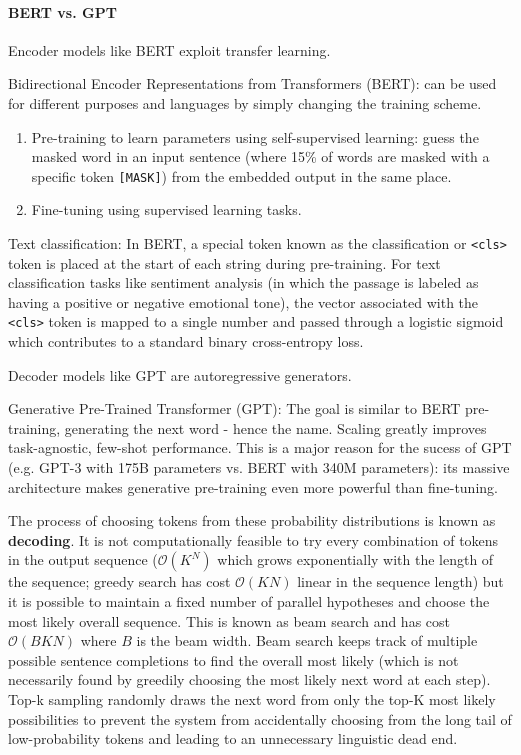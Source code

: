 \paragraph{BERT vs. GPT}

Encoder models like BERT exploit transfer learning.

Bidirectional Encoder Representations from Transformers (BERT):
can be used for different purposes and languages by simply changing the training scheme.

\begin{enumerate}
    \item Pre-training to learn parameters using self-supervised learning: guess the masked word in an input sentence (where 15\% of words are masked with a specific token \texttt{[MASK]}) from the embedded output in the same place.
    \item Fine-tuning using supervised learning tasks.
\end{enumerate}

Text classification: In BERT, a special token known as the classification or \texttt{<cls>}
token is placed at the start of each string during pre-training. For text classification
tasks like sentiment analysis (in which the passage is labeled as having a positive or
negative emotional tone), the vector associated with the \texttt{<cls>} token is mapped to a
single number and passed through a logistic sigmoid which contributes to a standard binary cross-entropy loss.

Decoder models like GPT are autoregressive generators.

Generative Pre-Trained Transformer (GPT):
The goal is similar to BERT pre-training, generating the next word - hence the name.
Scaling greatly improves task-agnostic, few-shot performance.
This is a major reason for the sucess of GPT (e.g. GPT-3 with 175B parameters vs. BERT with 340M parameters):
its massive architecture makes generative pre-training even more powerful than fine-tuning.

The process of choosing tokens from these probability distributions is known as \textbf{decoding}.
It is not computationally feasible to try every combination of tokens in the output sequence
($\mathcal{O}(K^N)$ which grows exponentially with the length of the sequence; greedy search has cost $\mathcal{O}(KN)$ linear in the sequence length)
but it is possible to maintain a fixed number of parallel hypotheses and choose the most likely
overall sequence. This is known as beam search and has cost $\mathcal{O}(B K N)$ where $B$ is the beam width.
Beam search keeps track of multiple possible sentence completions to find the overall most
likely (which is not necessarily found by greedily choosing the most likely next word at
each step). Top-k sampling randomly draws the next word from only the top-K most
likely possibilities to prevent the system from accidentally choosing from the long tail of
low-probability tokens and leading to an unnecessary linguistic dead end.

